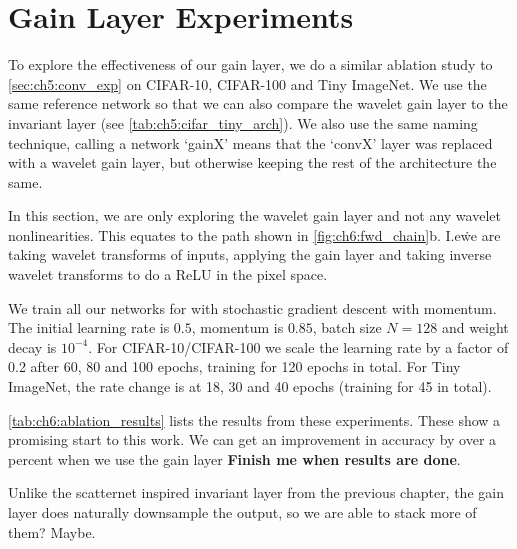 \section{Gain Layer Experiments}\label{sec:ch6:gainlayer_experiments}
To explore the effectiveness of our gain layer, we do a similar ablation study
to \autoref{sec:ch5:conv_exp} on CIFAR-10, CIFAR-100 and Tiny ImageNet. We use
the same reference network so that we can also compare the wavelet gain layer to the
invariant layer (see \autoref{tab:ch5:cifar_tiny_arch}). We also use the same
naming technique, calling a network `gainX' means that the `convX' layer was
replaced with a wavelet gain layer, but otherwise keeping the rest of the
architecture the same. 

In this section, we are only exploring the wavelet gain layer and not any
wavelet nonlinearities. This equates to the path shown in \autoref{fig:ch6:fwd_chain}b. 
I.e\. we are taking wavelet transforms of inputs, applying the gain layer and
taking inverse wavelet transforms to do a ReLU in the pixel space. 

We train all our networks for with stochastic gradient descent with momentum.
The initial learning rate is $0.5$, momentum is $0.85$, batch size $N=128$ and
weight decay is $10^{-4}$. For CIFAR-10/CIFAR-100 we scale the learning rate by
a factor of 0.2 after 60, 80 and 100 epochs, training for 120 epochs in total.
For Tiny ImageNet, the rate change is at 18, 30 and 40 epochs (training for 45 in total).



\autoref{tab:ch6:ablation_results} lists the results from these experiments.
These show a promising start to this work. We can get an improvement in accuracy
by over a percent when we use the gain layer \textbf{Finish me when results are
done}.

Unlike the scatternet inspired invariant layer from the previous chapter, the
gain layer does naturally downsample the output, so we are able to stack more of
them? Maybe.

